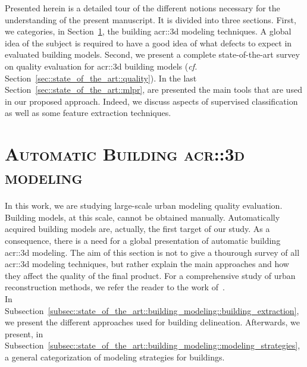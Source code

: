\minitoc

\vfill

Presented herein is a detailed tour of the different notions necessary for the understanding of the present manuscript.
It is divided into three sections.
First, we categories, in Section~\ref{sec::state_of_the_art::building_modeling}, the building \gls{acr::3d} modeling techniques.
A global idea of the subject is required to have a good idea of what defects to expect in evaluated building models.
Second, we present a complete state-of-the-art survey on quality evaluation for \gls{acr::3d} building models (\textit{cf.} Section~\ref{sec::state_of_the_art::quality}).
In the last Section~\ref{sec::state_of_the_art::mlpr}, are presented the main tools that are used in our proposed approach.
Indeed, we discuss aspects of supervised classification as well as some feature extraction techniques.

\clearpage

\section{\textsc{Automatic Building \texorpdfstring{\gls*{acr::3d}}{3D} modeling}}
    \label{sec::state_of_the_art::building_modeling}
    In this work, we are studying large-scale urban modeling quality evaluation.
    Building models, at this scale, cannot be obtained manually.
    Automatically acquired building models are, actually, the first target of our study.
    As a consequence, there is a need for a global presentation of automatic building \gls{acr::3d} modeling.
    The aim of this section is not to give a thourough survey of all \gls{acr::3d} modeling techniques, but rather explain the main approaches and how they affect the quality of the final product.
    For a comprehensive study of urban reconstruction methods, we refer the reader to the work of~\textcite{musialski2013survey}.\\
    In Subsection~\ref{subsec::state_of_the_art::building_modeling::building_extraction}, we present the different approaches used for building delineation.
    Afterwards, we present, in Subsection~\ref{subsec::state_of_the_art::building_modeling::modeling_strategies}, a general categorization of modeling strategies for buildings.

